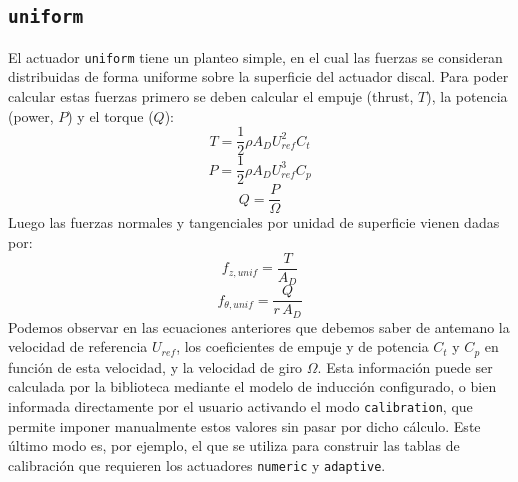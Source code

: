 \subsection{\texttt{uniform} \checkmark}
El actuador \texttt{uniform} tiene un planteo simple, en el cual las fuerzas se consideran distribuidas de forma uniforme sobre la superficie del actuador discal. Para poder calcular estas fuerzas primero se deben calcular el empuje (thrust, $T$), la potencia (power, $P$) y el torque ($Q$):
\begin{equation}
T = \frac{1}{2}\rho A_D U_{ref}^2 C_t
\label{eq:AD_uniforme_thrust}
\end{equation}
\begin{equation}
P = \frac{1}{2}\rho A_D U_{ref}^3 C_p
\label{eq:AD_uniforme_power}
\end{equation}
\begin{equation}
Q = \frac{P}{\Omega}
\label{eq:AD_uniforme_torque}
\end{equation}
Luego las fuerzas normales y tangenciales por unidad de superficie vienen dadas por:
\begin{equation}
f_{z,unif} = \frac{T}{A_D}
\label{eq:AD_uniforme_fz}
\end{equation}
\begin{equation}
f_{\theta,unif} = \frac{Q}{r \, A_D}
\label{eq:AD_uniforme_ftheta}
\end{equation}
Podemos observar en las ecuaciones anteriores que debemos saber de antemano la velocidad de referencia $U_{ref}$, los coeficientes de empuje y de potencia $C_t$ y $C_p$ en función de esta velocidad, y la velocidad de giro $\Omega$. Esta información puede ser calculada por la biblioteca mediante el modelo de inducción configurado, o bien informada directamente por el usuario activando el modo \texttt{calibration}, que permite imponer manualmente estos valores sin pasar por dicho cálculo. Este último modo es, por ejemplo, el que se utiliza para construir las tablas de calibración que requieren los actuadores \texttt{numeric} y \texttt{adaptive}.

